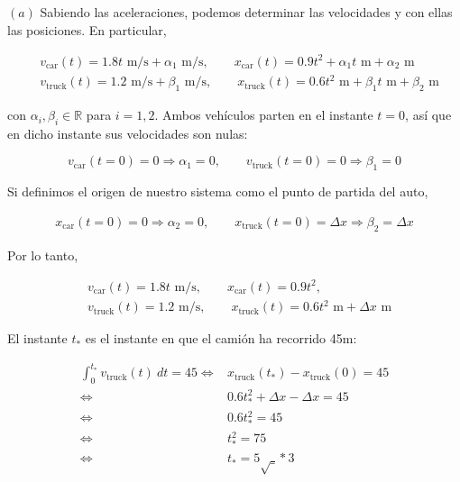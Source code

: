 \documentclass[12pt]{article}
\theoremstyle{definition}
\begin{document}
$(a)$ Sabiendo las aceleraciones, podemos determinar las velocidades y con ellas
las posiciones. En particular, 

\begin{align*}
    &v_{\text{car}}(t) = 1.8 t \text{ m/s} + \alpha_1 \text{ m/s}, \qquad x_{\text{car}}(t) =
    0.9t^2 + \alpha_1 t \text{ m} + \alpha_2\text{ m}\\ 
    &v_{\text{truck}}(t) = 1.2\text{ m/s} + \beta_1\text{ m/s},\qquad x_{\text{truck}}(t) =
    0.6t^2\text{ m} + \beta_1 t \text{ m} + \beta_2 \text{ m}
\end{align*}

con $\alpha_i, \beta_i \in \mathbb{R}$ para $i=1,2$. Ambos vehículos
parten en el instante $t=0$, así que en dicho instante sus velocidades son
nulas:

\begin{equation*}
    v_{\text{car}}(t=0) = 0 \Rightarrow \alpha_1 =0, \qquad
    v_{\text{truck}}(t=0) = 0 \Rightarrow \beta_1 = 0
\end{equation*}

Si definimos el origen de nuestro sistema como el punto de partida del auto,

\begin{align*}
    x_{\text{car}}(t=0) = 0 \Rightarrow  \alpha_2 = 0, \qquad
    x_{\text{truck}}(t=0) =  \Delta x \Rightarrow \beta_2 = \Delta x
\end{align*}

Por lo tanto,

\begin{align*}
    &v_{\text{car}}(t) = 1.8 t \text{ m/s}, \qquad x_{\text{car}}(t) =
    0.9t^2, \\
    &v_{\text{truck}}(t) = 1.2\text{ m/s}, \qquad x_{\text{truck}}(t) =
    0.6t^2\text{ m} + \Delta x\text{ m}
\end{align*}

El instante $t_*$ es el instante en que el camión ha recorrido 45m:


\begin{align*}
    \int_0^{t_*} v_{\text{truck}}(t) ~ dt = 45 \iff 
    &x_{\text{truck}}(t_*) - x_{\text{truck}}(0) = 45 \\ 
    \iff ~ ~ ~ 
    &0.6t_*^2 + \Delta x - \Delta x = 45 \\ 
    \iff  ~ ~  ~ 
    &0.6t_*^2 = 45 \\ 
    \iff ~ ~ ~ 
    &t_*^2 = 75 \\ 
    \iff ~ ~ ~ 
    &t_* = 5\sqrt_*{3}  
\end{align*}
\end{document}
